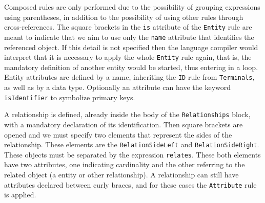 Composed rules are only performed due to the possibility of grouping expressions using parentheses, in addition to the possibility of using other rules through cross-references.
The square brackets in the \texttt{is} attribute of the \texttt{Entity} rule are meant to indicate that we aim to use only the \texttt{name} attribute that identifies the referenced object.
If this detail is not specified then the language compiler would interpret that it is necessary to apply the whole \texttt{Entity} rule again, that is, the mandatory definition of another entity would be started, thus entering in a loop.
Entity attributes are defined by a name, inheriting the \texttt{ID} rule from \texttt{Terminals}, as well as by a data type. 
Optionally an attribute can have the keyword \texttt{isIdentifier} to symbolize primary keys.

A relationship is defined, already inside the body of the \texttt{Relationships} block, with a mandatory declaration of its identification.
Then square brackets are opened and we must specify two elements that represent the sides of the relationship.
These elements are the \texttt{RelationSideLeft} and \texttt{RelationSideRight}.
These objects must be separated by the expression \texttt{relates}.
These both elements have two attributes, one indicating cardinality and the other referring to the related object (a entity or other relationship).
A relationship can still have attributes declared between curly braces, and for these cases the \texttt{Attribute} rule is applied.


